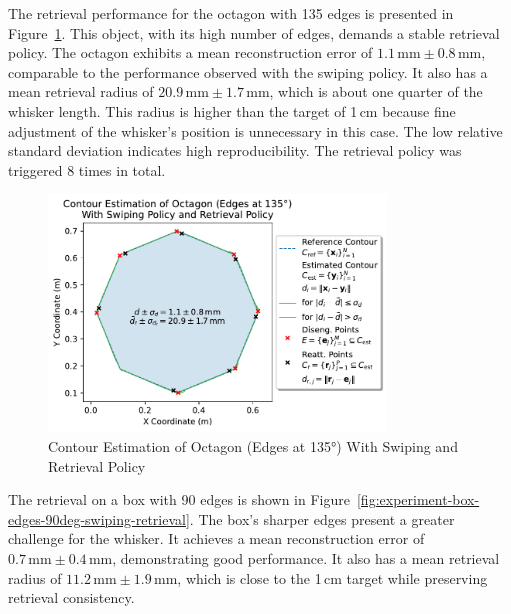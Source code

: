 The retrieval performance for the octagon with 135\degree{} edges is presented in Figure~\ref{fig:experiment-octagon-edges-135deg-swiping-retrieval}.
This object, with its high number of edges, demands a stable retrieval policy.
The octagon exhibits a mean reconstruction error of $1.1\,\text{mm} \pm 0.8\,\text{mm}$, comparable to the performance observed with the swiping policy.
It also has a mean retrieval radius of $20.9\,\text{mm} \pm 1.7\,\text{mm}$, which is about one quarter of the whisker length.
This radius is higher than the target of 1\,cm because fine adjustment of the whisker's position is unnecessary in this case.
The low relative standard deviation indicates high reproducibility.
The retrieval policy was triggered 8 times in total.

\begin{figure}[htb]
    \centering
    \includegraphics[width=0.8\textwidth]{figures/experiments/octagon-edges-135deg-swiping-retrieval}
    \caption{Contour Estimation of Octagon (Edges at 135°) With Swiping and Retrieval Policy}
    \label{fig:experiment-octagon-edges-135deg-swiping-retrieval}
\end{figure}

The retrieval on a box with 90\degree{} edges is shown in Figure~\ref{fig:experiment-box-edges-90deg-swiping-retrieval}.
The box’s sharper edges present a greater challenge for the whisker.
It achieves a mean reconstruction error of $0.7\,\text{mm} \pm 0.4\,\text{mm}$, demonstrating good performance.
It also has a mean retrieval radius of $11.2\,\text{mm} \pm 1.9\,\text{mm}$, which is close to the 1\,cm target while preserving retrieval consistency.

